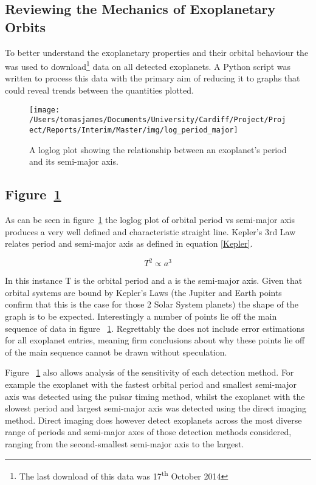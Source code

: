\documentclass[twoside]{article}
\begin{document}
\begin{multicols}{2}

\subsection{Reviewing the Mechanics of Exoplanetary Orbits}
To better understand the exoplanetary properties and their orbital behaviour the \cite{exo} was used to download\footnote{The last download of this data was 17\textsuperscript{th} October 2014} data on all detected exoplanets. A Python script was written to process this data with the primary aim of reducing it to graphs that could reveal trends between the quantities plotted.

\begin{figure}[H]
\centering
    \texttt{[image: /Users/tomasjames/Documents/University/Cardiff/Project/Project/Reports/Interim/Master/img/log\_period\_major]}
\caption{A loglog plot showing the relationship between an exoplanet's period and its semi-major axis.}\label{log_period_major}
\end{figure}

\subsection*{Figure~\ref{log_period_major}}
As can be seen in figure~\ref{log_period_major} the loglog plot of orbital period vs semi-major axis produces a very well defined and characteristic straight line. Kepler's 3rd Law relates period and semi-major axis as defined in equation \ref{Kepler}.

\begin{equation} \label{Kepler}
    T^{2} \propto a^{3} 
\end{equation}

In this instance T is the orbital period and a is the semi-major axis. Given that orbital systems are bound by Kepler's Laws (the Jupiter and Earth points confirm that this is the case for those 2 Solar System planets) the shape of the graph is to be expected. Interestingly a number of points lie off the main sequence of data in figure ~\ref{log_period_major}. Regrettably the \citeauthor{exo} does not include error estimations for all exoplanet entries, meaning firm conclusions about why these points lie off of the main sequence cannot be drawn without speculation. 

Figure ~\ref{log_period_major} also allows analysis of the sensitivity of each detection method. For example the exoplanet with the fastest orbital period and smallest semi-major axis was detected using the pulsar timing method, whilst the exoplanet with the slowest period and largest semi-major axis was detected using the direct imaging method. Direct imaging does however detect exoplanets across the most diverse range of periods and semi-major axes of those detection methods considered, ranging from the second-smallest semi-major axis to the largest. 


\end{multicols}
\end{document}
